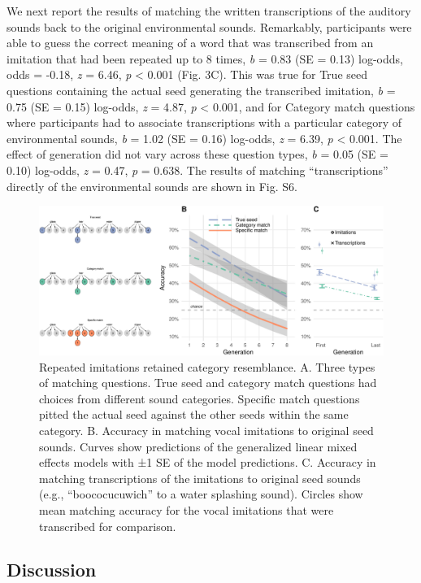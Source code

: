 \documentclass[english,floatsintext,man]{apa6}
\theoremstyle{definition}
\theoremstyle{definition}
\theoremstyle{definition}
\theoremstyle{remark}
\begin{document}
We next report the results of matching the written transcriptions of the
auditory sounds back to the original environmental sounds. Remarkably,
participants were able to guess the correct meaning of a word that was
transcribed from an imitation that had been repeated up to 8 times,
\emph{b} = 0.83 (SE = 0.13) log-odds, odds = -0.18, \emph{z} = 6.46,
\emph{p} \textless{} 0.001 (Fig. 3C). This was true for True seed
questions containing the actual seed generating the transcribed
imitation, \emph{b} = 0.75 (SE = 0.15) log-odds, \emph{z} = 4.87,
\emph{p} \textless{} 0.001, and for Category match questions where
participants had to associate transcriptions with a particular category
of environmental sounds, \emph{b} = 1.02 (SE = 0.16) log-odds, \emph{z}
= 6.39, \emph{p} \textless{} 0.001. The effect of generation did not
vary across these question types, \emph{b} = 0.05 (SE = 0.10) log-odds,
\emph{z} = 0.47, \emph{p} = 0.638. The results of matching
\enquote{transcriptions} directly of the environmental sounds are shown
in Fig. S6.

\begin{figure}
\centering
\includegraphics{fig3-1.pdf}
\caption{\label{fig:fig3}Repeated imitations retained category resemblance.
A. Three types of matching questions. True seed and category match
questions had choices from different sound categories. Specific match
questions pitted the actual seed against the other seeds within the same
category. B. Accuracy in matching vocal imitations to original seed
sounds. Curves show predictions of the generalized linear mixed effects
models with ±1 SE of the model predictions. C. Accuracy in matching
transcriptions of the imitations to original seed sounds (e.g.,
\enquote{boococucuwich} to a water splashing sound). Circles show mean
matching accuracy for the vocal imitations that were transcribed for
comparison.}
\end{figure}

\hypertarget{discussion-1}{%
\subsection{Discussion}\label{discussion-1}}
\end{document}
